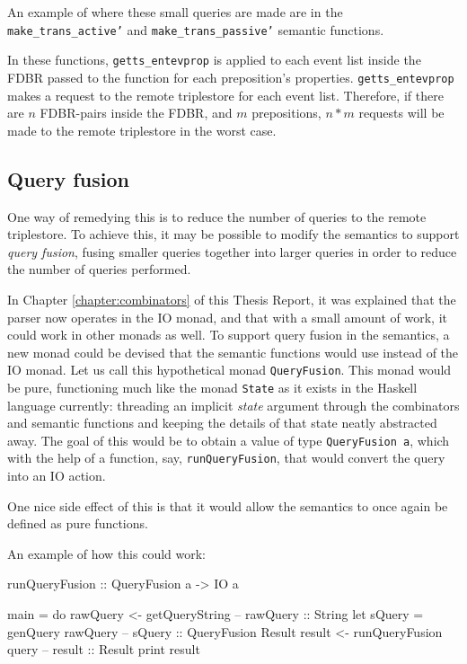 \documentclass[../main.tex]{subfiles}
\begin{document}
An example of where these small queries are made are in the \texttt{make\_trans\_active'} and \texttt{make\_trans\_passive'} semantic functions.

In these functions, \texttt{getts\_entevprop} is applied to each event list inside the FDBR passed to the function for each preposition's properties.  \texttt{getts\_entevprop} makes a request to the remote triplestore for each event list.  Therefore, if there are $n$ FDBR-pairs inside the FDBR, and
$m$ prepositions, $n*m$ requests will be made to the remote triplestore in the worst case.

\subsection{Query fusion}

One way of remedying this is to reduce the number of queries to the remote triplestore.  To achieve this, it may be possible to modify the semantics to
support {\em query fusion}, fusing smaller queries together into larger queries in order to reduce the number of queries performed.

In Chapter \ref{chapter:combinators} of this Thesis Report, it was explained that the parser now operates in the IO monad, and that with a small amount of work, it could
work in other monads as well.  To support query fusion in the semantics, a new monad could be devised that the semantic functions would use instead of the IO monad.  Let us
call this hypothetical monad \texttt{QueryFusion}.  This monad would be pure, functioning much like the monad \texttt{State} as it exists in the Haskell language currently: threading an implicit {\em state} argument through the combinators and semantic functions and keeping the details of that state neatly abstracted away.  The goal of this would be to obtain a value of type \texttt{QueryFusion a}, which with the help of a function, say, \texttt{runQueryFusion}, that would convert the query into an IO action.

One nice side effect of this is that it would allow the semantics to once again be defined as pure functions.

An example of how this could work:

\begin{code}
	
runQueryFusion :: QueryFusion a -> IO a

main = do
  rawQuery <- getQueryString      -- rawQuery :: String
  let sQuery = genQuery rawQuery  -- sQuery   :: QueryFusion Result
  result <- runQueryFusion query  -- result   :: Result
  print result

\end{code}
\end{document}
